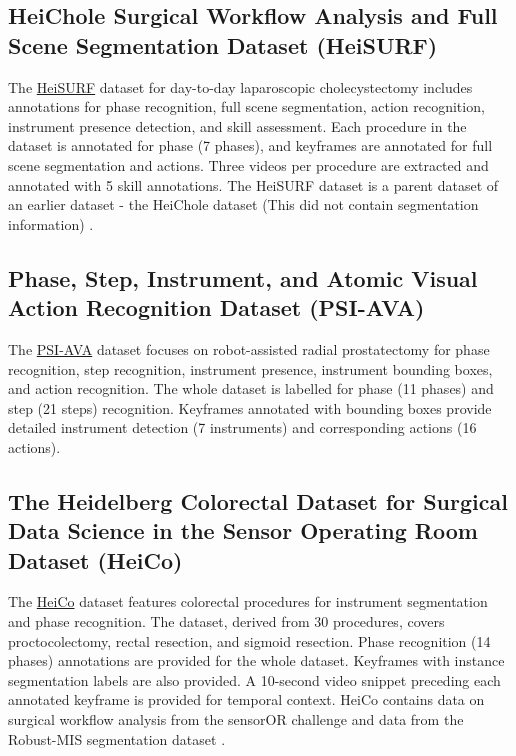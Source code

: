 \subsection{HeiChole Surgical Workflow Analysis and Full Scene Segmentation Dataset (HeiSURF)}
The \href{https://www.synapse.org/#!Synapse:syn25101790/wiki/}{HeiSURF} dataset \citep{heisurf} for day-to-day laparoscopic cholecystectomy includes annotations for phase recognition, full scene segmentation, action recognition, instrument presence detection, and skill assessment. Each procedure in the dataset is annotated for phase (7 phases), and keyframes are annotated for full scene segmentation and actions. Three videos per procedure are extracted and annotated with 5 skill annotations. The HeiSURF dataset is a parent dataset of an earlier dataset - the HeiChole dataset (This did not contain segmentation information) \citep{WAGNER2023102770}.



\subsection{Phase, Step, Instrument, and Atomic Visual Action Recognition Dataset (PSI-AVA)}
The \href{https://github.com/BCV-Uniandes/TAPIR}{PSI-AVA} dataset \citep{holistic_scene_understanding} focuses on robot-assisted radial prostatectomy for phase recognition, step recognition, instrument presence, instrument bounding boxes, and action recognition. The whole dataset is labelled for phase (11 phases) and step (21 steps) recognition. Keyframes annotated with bounding boxes provide detailed instrument detection (7 instruments) and corresponding actions (16 actions).


\subsection{The Heidelberg Colorectal Dataset for Surgical Data Science in the Sensor Operating Room Dataset (HeiCo)}
The \href{https://www.synapse.org/#!Synapse:syn21903917/wiki/601992}{HeiCo} \citep{heico} dataset features colorectal procedures for instrument segmentation and phase recognition. The dataset, derived from 30 procedures, covers proctocolectomy, rectal resection, and sigmoid resection. Phase recognition (14 phases) annotations are provided for the whole dataset. Keyframes with instance segmentation labels are also provided. A 10-second video snippet preceding each annotated keyframe is provided for temporal context. HeiCo contains data on surgical workflow analysis from the sensorOR challenge \citep{heico} and data from the Robust-MIS segmentation dataset \citep{robustmis2019}. 



